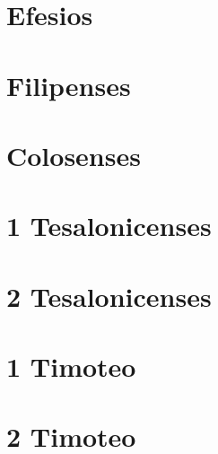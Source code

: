 \chapter{Efesios}
\begin{multicols}{2}
  \raggedcolumns
  \parskip=0pt \relax
  
\end{multicols}

\chapter{Filipenses}
\begin{multicols}{2}
  \raggedcolumns
  \parskip=0pt \relax
  
\end{multicols}

\chapter{Colosenses}
\begin{multicols}{2}
  \raggedcolumns
  \parskip=0pt \relax
  
\end{multicols}

\chapter{1 Tesalonicenses}
\begin{multicols}{2}
  \raggedcolumns
  \parskip=0pt \relax
  
\end{multicols}

\chapter{2 Tesalonicenses}
\begin{multicols}{2}
  \raggedcolumns
  \parskip=0pt \relax
  
\end{multicols}

\chapter{1 Timoteo}
\begin{multicols}{2}
  \raggedcolumns
  \parskip=0pt \relax
  
\end{multicols}

\chapter{2 Timoteo}
\begin{multicols}{2}
  \raggedcolumns
  \parskip=0pt \relax
  
\end{multicols}

